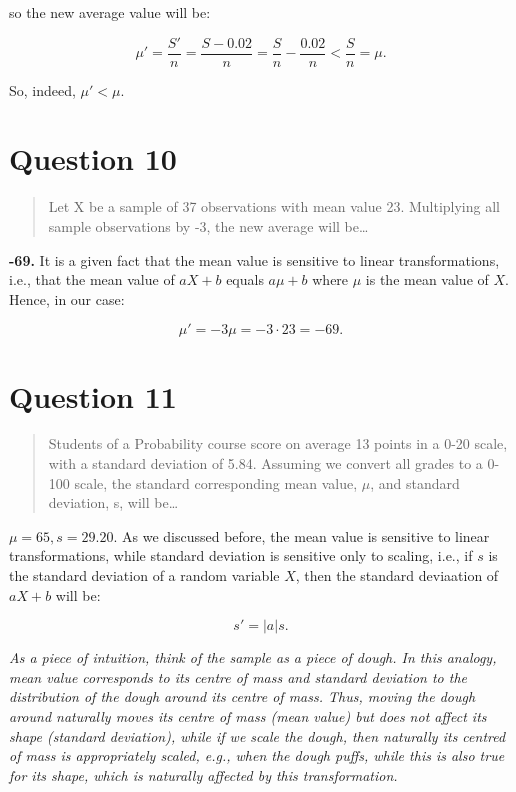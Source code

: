 \documentclass[
]{article}
\begin{document}
so the new average value will be:

\[\mu'=\frac{S'}{n}=\frac{S-0.02}{n}=\frac{S}{n}-\frac{0.02}{n}<\frac{S}{n}=\mu.\]

So, indeed, \(\mu'<\mu\).

\section{Question 10}\label{question-10}

\begin{quote}
Let X be a sample of 37 observations with mean value 23. Multiplying all
sample observations by -3, the new average will be\ldots{}
\end{quote}

\textbf{-69.} It is a given fact that the mean value is sensitive to
linear transformations, i.e., that the mean value of \(aX+b\) equals
\(a\mu+b\) where \(\mu\) is the mean value of \(X\). Hence, in our case:

\[\mu'=-3\mu=-3\cdot23=-69.\]

\section{Question 11}\label{question-11}

\begin{quote}
Students of a Probability course score on average 13 points in a 0-20
scale, with a standard deviation of 5.84. Assuming we convert all grades
to a 0-100 scale, the standard corresponding mean value, \(\mu\), and
standard deviation, s, will be\ldots{}
\end{quote}

\(\mu=65,s=29.20\). As we discussed before, the mean value is sensitive
to linear transformations, while standard deviation is sensitive only to
scaling, i.e., if \(s\) is the standard deviation of a random variable
\(X\), then the standard deviaation of \(aX+b\) will be:

\[s'=|a|s.\]

\emph{As a piece of intuition, think of the sample as a piece of dough.
In this analogy, mean value corresponds to its centre of mass and
standard deviation to the distribution of the dough around its centre of
mass. Thus, moving the dough around naturally moves its centre of mass
(mean value) but does not affect its shape (standard deviation), while
if we scale the dough, then naturally its centred of mass is
appropriately scaled, e.g., when the dough puffs, while this is also
true for its shape, which is naturally affected by this transformation.}
\end{document}
